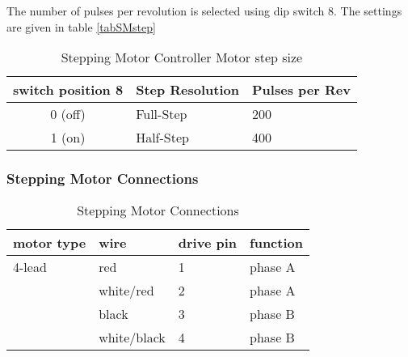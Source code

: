 The number of pulses per revolution is selected using dip switch 8.  The
settings are given in table \ref{tabSMstep}
\begin{table}[htb]
\begin{center}
\begin{tabular}{c|l|l} 
switch position 8 & Step Resolution & Pulses per Rev \\ \hline
0 (off) & Full-Step & 200 \\
1 (on)  & Half-Step & 400 \\
\end{tabular}
\caption[Stepping Motor Controller step size]
        {Stepping Motor Controller Motor step size
        }
\end{center}
\end{table}
 
\clearpage 
\newpage
\subsubsection{Stepping Motor Connections}
  
\begin{table}
\begin{center}
\begin{tabular}{|l|l|l|l|}
\hline
motor type &  wire  & drive pin & function \\
\hline
4-lead     &  red         & 1 & phase A\\
           &  white/red   & 2 & phase A\\
           &  black       & 3 & phase B\\
           &  white/black & 4 & phase B\\
\hline
\end{tabular}
\caption[Stepping Motor Connections]
        {Stepping Motor Connections
        }
\end{center}
\end{table}
  
\clearpage
\newpage
